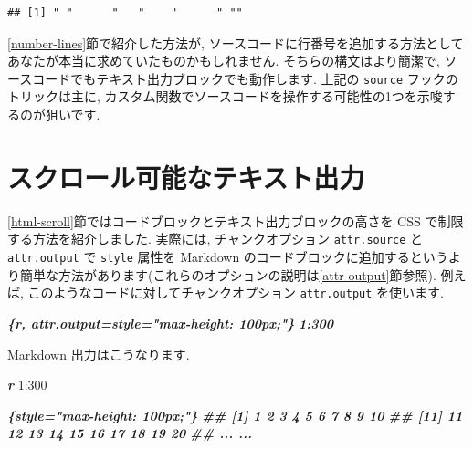 \documentclass[
  11pt,
]{bxjsreport}
\newenvironment{Shaded}{\begin{snugshade}}{\end{snugshade}}
\newcommand{\DecValTok}[1]{\textcolor[rgb]{0.00,0.00,0.81}{#1}}
\newcommand{\InformationTok}[1]{\textcolor[rgb]{0.56,0.35,0.01}{\textbf{\textit{#1}}}}
\newcommand{\SpecialCharTok}[1]{\textcolor[rgb]{0.00,0.00,0.00}{#1}}
\begin{document}
\begin{verbatim}
## [1] " "      "   "    "      " ""
\end{verbatim}

\ref{number-lines}節で紹介した方法が, ソースコードに行番号を追加する方法としてあなたが本当に求めていたものかもしれません. そちらの構文はより簡潔で, ソースコードでもテキスト出力ブロックでも動作します. 上記の \texttt{source} フックのトリックは主に, カスタム関数でソースコードを操作する可能性の1つを示唆するのが狙いです.

\hypertarget{hook-scroll}{%
\section{スクロール可能なテキスト出力}\label{hook-scroll}}

\ref{html-scroll}節ではコードブロックとテキスト出力ブロックの高さを CSS で制限する方法を紹介しました. 実際には, チャンクオプション \texttt{attr.source} と \texttt{attr.output} で \texttt{style} 属性を Markdown のコードブロックに追加するというより簡単な方法があります(これらのオプションの説明は\ref{attr-output}節参照). 例えば, このようなコードに対してチャンクオプション \texttt{attr.output} を使います.

\begin{Shaded}
\begin{Highlighting}[]
\InformationTok{\textasciigrave{}\textasciigrave{}\textasciigrave{}\{r, attr.output=\textquotesingle{}style="max{-}height: 100px;"\textquotesingle{}\}}
\InformationTok{1:300}
\InformationTok{\textasciigrave{}\textasciigrave{}\textasciigrave{}}
\end{Highlighting}
\end{Shaded}

Markdown 出力はこうなります.

\begin{Shaded}
\begin{Highlighting}[]
\InformationTok{\textasciigrave{}\textasciigrave{}\textasciigrave{}r}
\DecValTok{1}\SpecialCharTok{:}\DecValTok{300}
\InformationTok{\textasciigrave{}\textasciigrave{}\textasciigrave{}}

\InformationTok{\textasciigrave{}\textasciigrave{}\textasciigrave{}\{style="max{-}height: 100px;"\}}
\InformationTok{\#\#   [1]   1   2   3   4   5   6   7   8   9  10}
\InformationTok{\#\#  [11]  11  12  13  14  15  16  17  18  19  20}
\InformationTok{\#\#  ... ...}
\InformationTok{\textasciigrave{}\textasciigrave{}\textasciigrave{}}
\end{Highlighting}
\end{Shaded}
\end{document}

